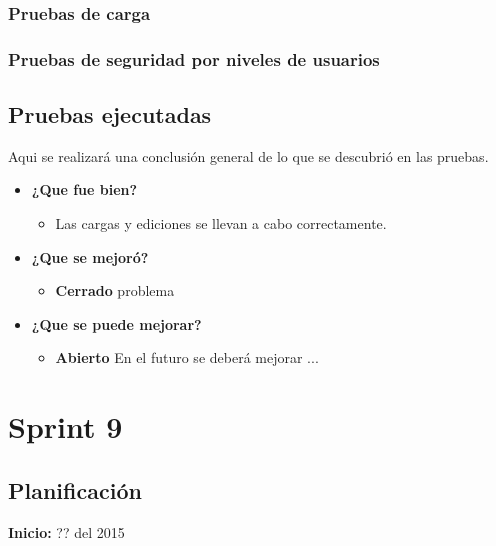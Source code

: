 \documentclass[a4paper,12pt]{article}
\begin{document}
\subsubsection{Pruebas de carga}

\subsubsection{Pruebas de seguridad por niveles de usuarios}


\subsection{Pruebas ejecutadas}
Aqui se realizará una conclusión general de lo que se descubrió en las pruebas.
	\begin{itemize}
		\item \textbf{¿Que fue bien?}
        	\begin{itemize}
				\item        Las cargas y ediciones se llevan a cabo correctamente.
			\end{itemize}

   		\item \textbf{¿Que se mejoró?}
        	\begin{itemize}
                \item \textbf{Cerrado} problema
			\end{itemize}

   		\item \textbf{¿Que se puede mejorar?}
        	\begin{itemize}
		        \item \textbf{Abierto} En el futuro se deberá mejorar ...
            \end{itemize}
        

	\end{itemize}


\section{Sprint 9} %

\subsection{Planificación}

\textbf{Inicio: }?? del 2015 
\end{document}
